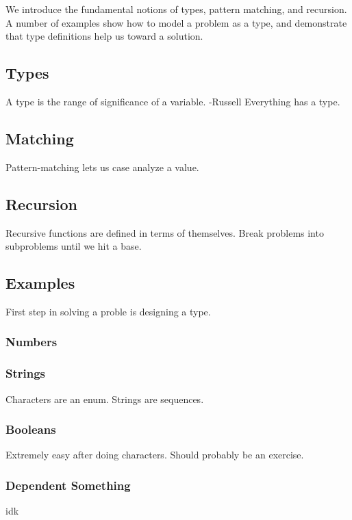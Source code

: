 \documentclass{article}
\begin{document}
\maketitle
We introduce the fundamental notions of types, pattern matching, and recursion.
A number of examples show how to model a problem as a type, and demonstrate that type definitions help us toward a solution.

\subsection*{Types}
A type is the range of significance of a variable. -Russell
Everything has a type.

\subsection*{Matching}
Pattern-matching lets us case analyze a value.

\subsection*{Recursion}
Recursive functions are defined in terms of themselves.
Break problems into subproblems until we hit a base.

\subsection*{Examples}
First step in solving a proble is designing a type.

\subsubsection*{Numbers}

\subsubsection*{Strings}
Characters are an enum.
Strings are sequences.

\subsubsection*{Booleans}
Extremely easy after doing characters.
Should probably be an exercise.

\subsubsection*{Dependent Something}
idk
\end{document}

